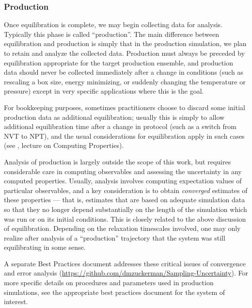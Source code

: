 \documentclass[9pt,bestpractices]{livecoms}
\begin{document}
\subsubsection{Production}

Once equilibration is complete, we may begin collecting data for analysis.
Typically this phase is called ``production''.
The main difference between equilibration and production is simply that in the production simulation, we plan to retain and analyze the collected data.
Production must always be preceded by equilibration appropriate for the target production ensemble, and production data should never be collected immediately after a change in conditions (such as rescaling a box size, energy minimizing, or suddenly changing the temperature or pressure) except in very specific applications where this is the goal.

For bookkeeping purposes, sometimes practitioners choose to discard some initial production data as additional equilibration; usually this is simply to allow additional equilibration time after a change in protocol (such as a switch from NVT to NPT), and the usual considerations for equilibration apply in such cases (see \citet{ShellNotes}, lecture on Computing Properties). 

Analysis of production is largely outside the scope of this work, but requires considerable care in computing observables and assessing the uncertainty in any computed properties.
Usually, analysis involves computing expectation values of particular observables, and a key consideration is to obtain \emph{converged} estimates of these properties --- that is, estimates that are based on adequate simulation data so that they no longer depend substantially on the length of the simulation which was run or on its initial conditions.
This is closely related to the above discussion of equilibration.
Depending on the relaxation timescales involved, one may only realize after analysis of a ``production'' trajectory that the system was still equilibrating in some sense.

A separate Best Practices document addresses these critical issues of convergence and error analysis (\url{https://github.com/dmzuckerman/Sampling-Uncertainty}). 
For more specific details on procedures and parameters used in production simulations, see the appropriate best practices document for the system of interest.

\end{document}

